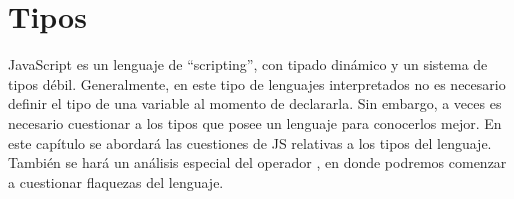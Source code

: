 \chapter{Tipos} %

\label{ch:tipos} %


JavaScript es un lenguaje de "`scripting"', con tipado dinámico y un sistema de tipos débil. Generalmente, en este tipo de lenguajes interpretados no es necesario definir el tipo de una variable al momento de declararla. Sin embargo, a veces es necesario cuestionar a los tipos que posee un lenguaje para conocerlos mejor. En este capítulo se abordará las cuestiones de JS relativas a los tipos del lenguaje. También se hará un análisis especial del operador , en donde podremos comenzar a cuestionar flaquezas del lenguaje.


